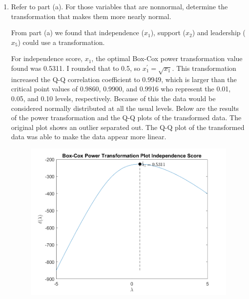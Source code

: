 \begin{enumerate}[label= (\alph*)]
    \item Refer to part (a). For those variables that are nonnormal, determine the transformation that makes them more nearly normal.
    
    From part (a) we found that independence ($x_{1}$), support ($x_{2}$) and leadership ($x_{5}$) could use a transformation.

    For independence score, $x_{1}$, the optimal Box-Cox power transformation value found was 0.5311.
    I rounded that to 0.5, so $x_{1}^{\prime} = \sqrt{x_{1}}$. This transformation increased the Q-Q correlation coefficient to 0.9949, which is larger than the critical point values of 0.9860, 0.9900, and 0.9916 who represent the 0.01, 0.05, and 0.10 levels, respectively.
    Because of this the data would be considered normally distributed at all the usual levels.
    Below are the results of the power transformation and the Q-Q plots of the transformed data.
    The original plot shows an outlier separated out. The Q-Q plot of the transformed data was able to make the data appear more linear.

    \begin{center}
        \begin{figure}[H]
            \centering
            \includegraphics[scale=0.4]{./matlab/chapter-4/sol4.39.power.1.png}
        \end{figure}
    \end{center}
    

\end{enumerate}

